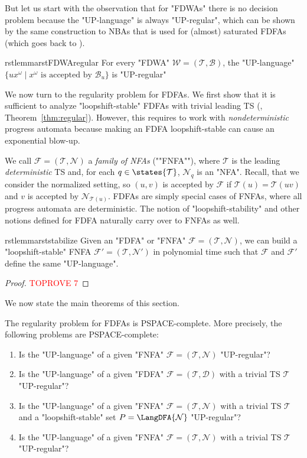 \documentclass[a4paper,USenglish,cleveref,autoref,thm-restate]{lipics-v2021}
\newcommand{\mc}[1]{\ensuremath{\mathcal{#1}}}
\newcommand{\T}{\mc{T}}
\newcommand{\F}{\mc{F}}
\newcommand{\N}{\mc{N}}
\newcommand{\D}{\mc{D}}
\newcommand{\B}{\mc{B}}
\newcommand{\W}{\mc{W}}
\newcommand{\PSPACE}{\textsf{PSPACE}\xspace}
\begin{document}
But let us start with the observation that for "FDWAs" there is no decision problem because the "UP-language" is always "UP-regular", which can be shown by the same construction to NBAs that is used for (almost) saturated FDFAs (which goes back to \cite{CalbrixNP93}).

\begin{restatable}{rstlemma}{rstFDWAregular} \label{lemma:FDWAregular}
  For every "FDWA" $\W = (\T,\B)$, the "UP-language" $\{ux^\omega \mid x^\omega \text{ is accepted by } \B_u\}$ is "UP-regular"
\end{restatable}







We now turn to the regularity problem for FDFAs.  We first show that it is sufficient to analyze "loopshift-stable" FDFAs with trivial leading TS (, Theorem~\ref{thm:regular}). However, this requires to work with \emph{nondeterministic} progress automata because making an FDFA loopshift-stable can cause an exponential blow-up.


\AP
We call $\F=(\T,\N)$ a \emph{family of NFAs} (""FNFA""), where $\T$ is the leading \emph{deterministic} TS and, for each $q \in \states{\T}$, $\N_q$ is an "NFA".
Recall, that we consider the normalized setting, so $(u,v)$ is accepted by $\F$ if $\T(u) = \T(uv)$ and $v$ is accepted by $\N_{\T(u)}$.
FDFAs are simply special cases of FNFAs, where all progress automata are deterministic.
The notion of "loopshift-stability" and other notions defined for FDFA naturally carry over to FNFAs as well.


\begin{restatable}{rstlemma}{rststabilize}
  \label{lem:stabalize}
  Given an "FDFA" or "FNFA" $\F = (\T,\N)$, we can build a "loopshift-stable"
  FNFA $\F'=(\T,\N')$ in polynomial time such that $\F$ and $\F'$ define the same "UP-language".
\end{restatable}

\begin{proof}\textcolor{red}{TOPROVE 7}\end{proof}

We now state the main theorems of this section.

\begin{theorem}
  \label{thm:regular}
  The regularity problem for FDFAs is \PSPACE-complete. More precisely,
  the following problems are \PSPACE-complete:
  \begin{enumerate}
    \item Is the "UP-language" of a given "FNFA" $\F=(\T,\N)$ "UP-regular"?
    \item Is the "UP-language" of a given "FDFA" $\F=(\T,\D)$ with a trivial TS $\T$ "UP-regular"?
    \item Is the "UP-language" of a given "FNFA" $\F=(\T,\N)$ with a trivial TS $\T$ and a "loopshift-stable" set $P=\LangDFA{\N}$ "UP-regular"?
    \item Is the "UP-language" of a given "FNFA" $\F=(\T,\N)$ with a trivial TS $\T$ "UP-regular"?
  \end{enumerate}
\end{theorem}
\end{document}
